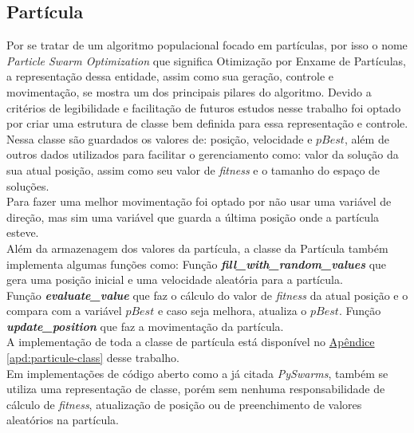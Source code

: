 \subsection{Partícula}
Por se tratar de um algoritmo populacional focado em partículas, por isso o nome \textit{Particle Swarm Optimization} que significa Otimização por Enxame de Partículas, a representação dessa entidade, assim como sua geração, controle e movimentação, se mostra um dos principais pilares do algoritmo. Devido a critérios de legibilidade e facilitação de futuros estudos nesse trabalho foi optado por criar uma estrutura de classe bem definida para essa representação e controle.
Nessa classe são guardados os valores de: posição, velocidade e $pBest$, além de outros dados utilizados para facilitar o gerenciamento como: valor da solução da sua atual posição, assim como seu valor de \textit{fitness} e o tamanho do espaço de soluções.\\
\indent Para fazer uma melhor movimentação foi optado por não usar uma variável de direção, mas sim uma variável que guarda a última posição onde a partícula esteve.\\
Além da armazenagem dos valores da partícula, a classe da Partícula também implementa algumas funções como:
Função \textbf{\textit{fill\_with\_random\_values}} que gera uma posição inicial e uma velocidade aleatória para a partícula.\\
Função \textbf{\textit{evaluate\_value}} que faz o cálculo do valor de \textit{fitness} da atual posição e o compara com a variável $pBest$ e caso seja melhora, atualiza o $pBest$.
Função \textbf{\textit{update\_position}} que faz a movimentação da partícula.\\
\noindent A implementação de toda a classe de partícula está disponível no 
\hyperref[apd:particule-class]{Apêndice \ref{apd:particule-class}}
desse trabalho.\\
%
\indent Em implementações de código aberto como a já citada \textit{PySwarms}, também se utiliza uma representação de classe, porém sem nenhuma responsabilidade de cálculo de \textit{fitness}, atualização de posição ou de preenchimento de valores aleatórios na partícula.\\
%
